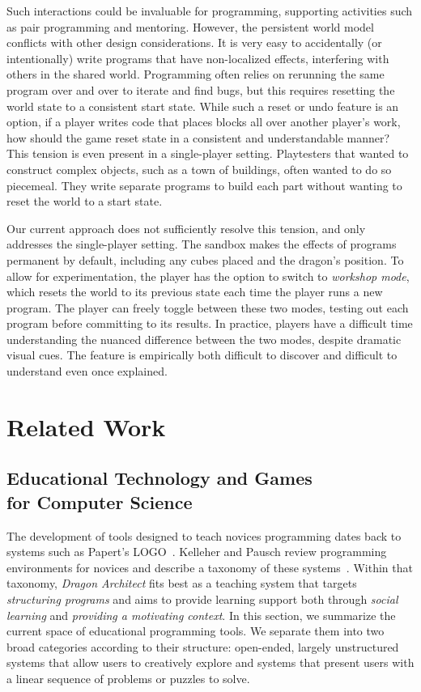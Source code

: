 \documentclass{sig-alternate}
\newcommand{\gametitle}{{\emph{Dragon Architect}}}
\begin{document}
Such interactions could be invaluable for programming, supporting activities such as pair programming and mentoring.
However, the persistent world model conflicts with other design considerations.
It is very easy to accidentally (or intentionally) write programs that have non-localized effects, interfering with others in the shared world.
Programming often relies on rerunning the same program over and over to iterate and find bugs, but this requires resetting the world state to a consistent start state.
While such a reset or undo feature is an option, if a player writes code that places blocks all over another player's work, how should the game reset state in a consistent and understandable manner?
This tension is even present in a single-player setting.
Playtesters that wanted to construct complex objects, such as a town of buildings, often wanted to do so piecemeal. They write separate programs to build each part without wanting to reset the world to a start state.

Our current approach does not sufficiently resolve this tension, and only addresses the single-player setting.
The sandbox makes the effects of programs permanent by default, including any cubes placed and the dragon's position.
To allow for experimentation, the player has the option to switch to \emph{workshop mode}, which resets the world to its previous state each time the player runs a new program. 
The player can freely toggle between these two modes, testing out each program before committing to its results. 
In practice, players have a difficult time understanding the nuanced difference between the two modes, despite dramatic visual cues.
The feature is empirically both difficult to discover and difficult to understand even once explained.

\section{Related Work}

\subsection{Educational Technology and Games\\for Computer Science}

The development of tools designed to teach novices programming dates back to systems such as Papert's LOGO~\cite{papert80mindstorms}.
Kelleher and Pausch review programming environments for novices and describe a taxonomy of these systems~\cite{kelleher2005lowering}.
Within that taxonomy, \gametitle{} fits best as a teaching system that targets \emph{structuring programs} and aims to provide learning support both through \emph{social learning} and \emph{providing a motivating context}. 
In this section, we summarize the current space of educational programming tools. 
We separate them into two broad categories according to their structure: open-ended, largely unstructured systems that allow users to creatively explore and systems that present users with a linear sequence of problems or puzzles to solve. 
\end{document}
